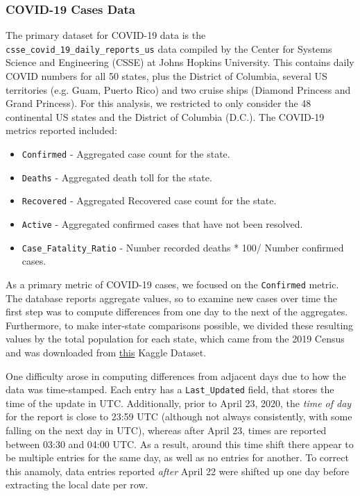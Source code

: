 \documentclass[11pt]{article}
\begin{document}
\subsubsection{COVID-19 Cases Data}
The primary dataset for COVID-19 data is the \texttt{csse\_covid\_19\_daily\_reports\_us} data compiled by the Center for Systems Science and Engineering (CSSE) at Johns Hopkins University. This contains daily COVID numbers for all 50 states, plus the District of Columbia, several US territories (e.g. Guam, Puerto Rico) and two cruise ships (Diamond Princess and Grand Princess). For this analysis, we restricted to only consider the 48 continental US states and the District of Columbia (D.C.). 
%
The COVID-19 metrics reported included: 
\begin{itemize}
  \setlength\itemsep{0.1em}
\item \texttt{Confirmed} - Aggregated case count for the state.
\item \texttt{Deaths} - Aggregated death toll for the state.
\item \texttt{Recovered} - Aggregated Recovered case count for the state.
\item \texttt{Active} - Aggregated confirmed cases that have not been resolved. 
\item \texttt{Case\_Fatality\_Ratio} - Number recorded deaths * 100/ Number confirmed cases.
\end{itemize}
As a primary metric of COVID-19 cases, we focused on the \texttt{Confirmed} metric. The database reports aggregate values, so to examine new cases over time the first step was to compute differences from one day to the next of the aggregates. Furthermore, to make inter-state comparisons possible, we divided these resulting values by the total population for each state, which came from the 2019 Census and was downloaded from \href{https://www.kaggle.com/peretzcohen/2019-census-us-population-data-by-state}{this} Kaggle Dataset. 

One difficulty  arose in computing differences from adjacent days due to how the data was time-stamped. Each entry has a \texttt{Last\_Updated} field, that stores the time of the update in UTC. Additionally, prior to April 23, 2020, the \textit{time of day} for the report is close to 23:59 UTC (although not always consistently, with some falling on the next day in UTC), whereas after April 23, times are reported between 03:30 and 04:00 UTC. As a result, around this time shift there appear to be multiple entries for the same day, as well as no entries for another. To correct this anamoly, data entries reported \textit{after} April 22 were shifted up one day before extracting the local date per row. 
\end{document}
